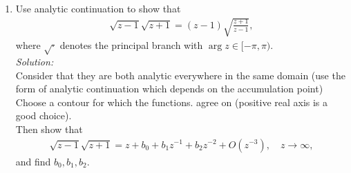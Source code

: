\documentclass[10pt]{amsart}
\theoremstyle{nonumberplain}
\begin{document}
\begin{enumerate}[label={\bf {\arabic*}:}]
\item Use analytic continuation to show that
  \begin{align*}
    \sqrt{z -1} \sqrt{z + 1} = (z -1) \sqrt{ \frac{ z +1}{z-1}},
  \end{align*}
  where $\sqrt{\cdot}$ denotes the principal branch with $\arg z \in
  [-\pi, \pi)$. \\
  \textit{Solution:} \\
  Consider that they are both analytic everywhere in the same domain (use the form of analytic continuation which depends on the accumulation point) \\
  Choose a contour for which the functions. agree on (positive real axis is a good choice). \\
  
  \noindent
  Then show that
  \begin{align*}
    \sqrt{z -1} \sqrt{z + 1} = z + b_0 + b_1 z^{-1} + b_2  z^{-2} +
    O(z^{-3}), \quad z \to \infty,
  \end{align*}
  and find $b_0,b_1,b_2$.
  
\end{enumerate}
\end{document}
